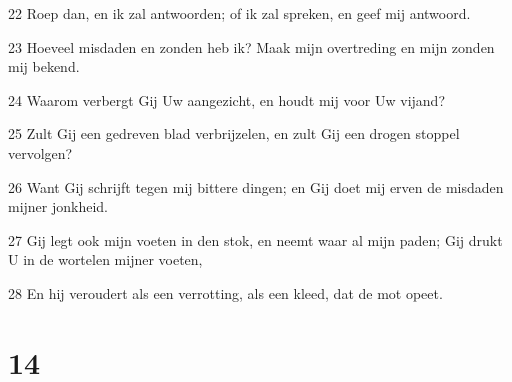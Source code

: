 \par 22 Roep dan, en ik zal antwoorden; of ik zal spreken, en geef mij antwoord.
\par 23 Hoeveel misdaden en zonden heb ik? Maak mijn overtreding en mijn zonden mij bekend.
\par 24 Waarom verbergt Gij Uw aangezicht, en houdt mij voor Uw vijand?
\par 25 Zult Gij een gedreven blad verbrijzelen, en zult Gij een drogen stoppel vervolgen?
\par 26 Want Gij schrijft tegen mij bittere dingen; en Gij doet mij erven de misdaden mijner jonkheid.
\par 27 Gij legt ook mijn voeten in den stok, en neemt waar al mijn paden; Gij drukt U in de wortelen mijner voeten,
\par 28 En hij veroudert als een verrotting, als een kleed, dat de mot opeet.

\chapter{14}

